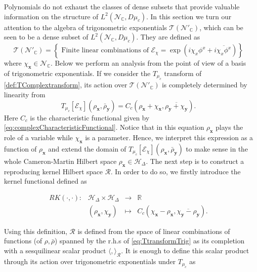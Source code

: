 \documentclass{elsarticle}%
\begin{document}
 Polynomials do not exhaust the classes of dense subsets that provide valuable information on the structure of $L^2(\mathcal{N}_\mathbb{C}, D\mu_c)$. In this section we turn our attention to the  algebra of trigonometric exponentials $\mathcal{T}(\mathcal{N}'_\mathbb{C})$, which can be seen  to be a dense subset of $L^2(\mathcal{N}_\mathbb{C}, D\mu_c)$. They are defined as   
\begin{equation}
\label{eq:trigExponentials}
\mathcal{T}(\mathcal{N}'_\mathbb{C})=\left\{\textrm{ Finite linear combinations of }  \mathcal{E}_{\chi}=\exp\left(i\chi_x\phi^x+i\overline{\chi_x\phi^x}\right)\right\}
\end{equation}
where $\chi_{\mathbf{x}}\in \mathcal{N}_{\mathbb{C}}$. Below we perform an analysis from the point of view of a basis of trigonometric exponentials.  If we consider the  $T_{\mu_c}$ transform of \autoref{def:TComplextransform}, its action over $\mathcal{T}(\mathcal{N}'_\mathbb{C})$ is completely  determined by linearity from  
\begin{equation}
\label{eq:TtransformTrig}
T_{\mu_c}[\mathcal{E}_{\chi}](\rho_\mathbf{x},\bar{\rho}_\mathbf{y})=C_c(\rho_{\mathbf{x}}+\chi_{\mathbf{x}},\overline{\rho_{\mathbf{y}}+\chi_{\mathbf{y}}}).
\end{equation}
Here $C_c$ is the characteristic functional given by \eqref{eq:complexCharacteristicFunctional}. Notice that in this equation $\rho_\mathbf{x}$ plays the role of a variable while $\chi_\mathbf{x}$ is a parameter. Hence, we interpret this expression as a function of $\rho_\mathbf{x}$ and extend the domain of  $T_{\mu_c}[\mathcal{E}_{\chi}](\rho_\mathbf{x},\bar{\rho}_\mathbf{y})$ to make sense in the whole Cameron-Martin Hilbert space  $\rho_{\mathbf{x}}\in \mathcal{H}_\Delta$. The next step is to construct a reproducing kernel Hilbert space $\mathcal{R}$. In order to do so, we firstly introduce the kernel functional defined as

\begin{equation}
    \label{eq:kernelforRKHS}
    \begin{array}{cccc}
    RK(\cdot,\cdot) :&\mathcal{H}_\Delta \times \mathcal{H}_\Delta & \longrightarrow & \mathbb{R} \\ 
     & (\rho_\mathbf{x},\chi_\mathbf{y}) &\longmapsto & C_c(\chi_{\mathbf{x}}-\rho_{\mathbf{x}},\overline{\chi_{\mathbf{y}}-\rho_{\mathbf{y}}}).
    \end{array}
    \end{equation}

    Using this definition, $\mathcal{R}$ is defined from the space of linear combinations of  functions (of $\rho,\bar\rho$) spanned by the r.h.s of \eqref{eq:TtransformTrig} as its completion with a sesquilinear scalar product $\langle,\rangle_{\mathcal{R}}$. It is enough to define this scalar product through its action over trigonometric exponentials under $T_{\mu_c}$ as
\end{document}
